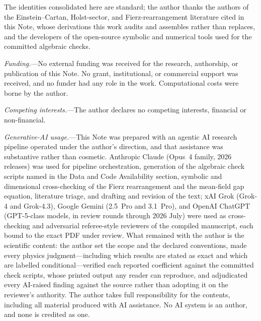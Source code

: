 \documentclass[aps,prd,twocolumn,superscriptaddress,preprintnumbers,nofootinbib,longbibliography,floatfix]{revtex4-2}
\begin{document}
\begin{acknowledgments}
The identities consolidated here are standard; the author thanks the authors of
the Einstein--Cartan, Holst-sector, and Fierz-rearrangement literature cited in
this Note, whose derivations this work audits and assembles rather than
replaces, and the developers of the open-source symbolic and numerical tools
used for the committed algebraic checks.

\emph{Funding.}---No external funding was received for the research,
authorship, or publication of this Note. No grant, institutional, or commercial
support was received, and no funder had any role in the work. Computational
costs were borne by the author.

\emph{Competing interests.}---The author declares no competing interests,
financial or non-financial.

\emph{Generative-AI usage.}---This Note was prepared with an agentic AI research pipeline operated under the author's direction, and that assistance was substantive rather than cosmetic. Anthropic Claude (Opus~4 family, 2026 releases) was used for pipeline orchestration, generation of the algebraic check scripts named in the Data and Code Availability section, symbolic and dimensional cross-checking of the Fierz rearrangement and the mean-field gap equation, literature triage, and drafting and revision of the text; xAI Grok (Grok-4 and Grok-4.3), Google Gemini (2.5~Pro and 3.1~Pro), and OpenAI ChatGPT (GPT-5-class models, in review rounds through 2026 July) were used as cross-checking and adversarial referee-style reviewers of the compiled manuscript, each bound to the exact PDF under review. What remained with the author is the scientific content: the author set the scope and the declared conventions, made every physics judgment---including which results are stated as exact and which are labelled conditional---verified each reported coefficient against the committed check scripts, whose printed output any reader can reproduce, and adjudicated every AI-raised finding against the source rather than adopting it on the reviewer's authority. The author takes full responsibility for the contents, including all material produced with AI assistance. No AI system is an author, and none is credited as one.
\end{acknowledgments}
\end{document}
